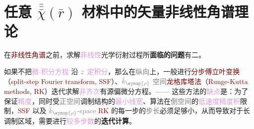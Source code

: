 
\chapter{任意 \texorpdfstring{$\bar{\bar{\bar{\chi}}} ( \bar{r} )$}{$\bar{\bar{\bar{\text{χ}}}} ( \bar{r} )$} 材料中的矢量非线性角谱理论}\label{chap:NLAST}
\noindent{}
\vspace{-\baselineskip} %

在\textcolor{Maroon}{非线性角谱}之前，求解\textcolor{Plum}{非线性}光学衍射过程所\textbf{面临的问题}有二。

{\one} 如果不把\textcolor{Plum}{微-积分方程}  沿 $\mathcolor{gray}{z}$ \textcolor{Plum}{定积分}，那么在\textcolor{gray}{纵向}上，一般进行\textcolor{Maroon}{分步傅立叶变换}（\textcolor{Maroon}{split-step Fourier transform}, \textcolor{Maroon}{SSF}）\cite{ellenbogenNonlinearGenerationManipulation2009,saltielCerenkovTypeSecondHarmonicGeneration2009, barsiImagingNonlinearMedia2009, trajtenberg-millsSimulatingCorrelationsStructured2020, rozenbergInverseDesignSpontaneous2022, yesharimObservationAllopticalStern2022}、$\mathcolor{gray}{\bar{k}_{\symup{\rho}}}$ \textcolor{gray}{空间}\textcolor{Maroon}{龙格库塔法}（\textcolor{Maroon}{Runge-Kutta methods}, \textcolor{Maroon}{RK}）\cite{zhangFullyVectorialSimulation2016,zhongKdomainMethodFast2020}迭代求解\textcolor{Plum}{非齐次}\textcolor{NavyBlue}{有源}偏微分方程。—— 这些方法的\textcolor{Plum}{缺点}是：为了保证\textcolor{Plum}{精度}，同时受\textcolor{gray}{正空间}\textcolor{NavyBlue}{调制结构}的\textcolor{Plum}{最小线宽}、算法在\textcolor{gray}{倒空间}的\textcolor{Plum}{低速度精度积}限制，\textcolor{Maroon}{SSF} 以及 $\mathcolor{gray}{\bar{k}_{\symup{\rho}}}$\textcolor{gray}{-space} \textcolor{Maroon}{RK} 的每一步的\textcolor{gray}{步长}必须足够小，从而导致对于\textcolor{NavyBlue}{长调制区域}，需要进行\textcolor{Plum}{较多步数}的\textbf{迭代计算}。

